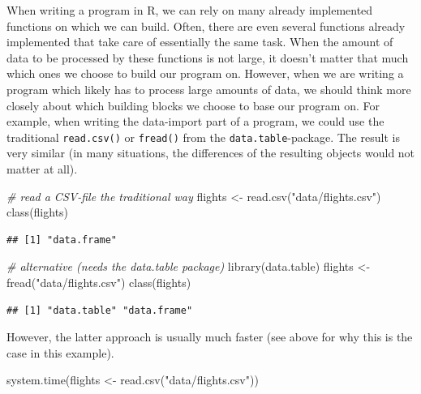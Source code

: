 \documentclass[
  12pt,
]{style/krantz}
\newenvironment{Shaded}{\begin{snugshade}}{\end{snugshade}}
\newcommand{\CommentTok}[1]{\textcolor[rgb]{0.56,0.35,0.01}{\textit{#1}}}
\newcommand{\FunctionTok}[1]{\textcolor[rgb]{0.00,0.00,0.00}{#1}}
\newcommand{\NormalTok}[1]{#1}
\newcommand{\OtherTok}[1]{\textcolor[rgb]{0.56,0.35,0.01}{#1}}
\newcommand{\StringTok}[1]{\textcolor[rgb]{0.31,0.60,0.02}{#1}}
\begin{document}
When writing a program in R, we can rely on many already implemented functions on which we can build. Often, there are even several functions already implemented that take care of essentially the same task. When the amount of data to be processed by these functions is not large, it doesn't matter that much which ones we choose to build our program on. However, when we are writing a program which likely has to process large amounts of data, we should think more closely about which building blocks we choose to base our program on. For example, when writing the data-import part of a program, we could use the traditional \texttt{read.csv()} or \texttt{fread()} from the \texttt{data.table}-package. The result is very similar (in many situations, the differences of the resulting objects would not matter at all).

\begin{Shaded}
\begin{Highlighting}[]
\CommentTok{\# read a CSV{-}file the \textquotesingle{}traditional way\textquotesingle{}}
\NormalTok{flights }\OtherTok{\textless{}{-}} \FunctionTok{read.csv}\NormalTok{(}\StringTok{"data/flights.csv"}\NormalTok{)}
\FunctionTok{class}\NormalTok{(flights)}
\end{Highlighting}
\end{Shaded}

\begin{verbatim}
## [1] "data.frame"
\end{verbatim}

\begin{Shaded}
\begin{Highlighting}[]
\CommentTok{\# alternative (needs the data.table package)}
\FunctionTok{library}\NormalTok{(data.table)}
\NormalTok{flights }\OtherTok{\textless{}{-}} \FunctionTok{fread}\NormalTok{(}\StringTok{"data/flights.csv"}\NormalTok{)}
\FunctionTok{class}\NormalTok{(flights)}
\end{Highlighting}
\end{Shaded}

\begin{verbatim}
## [1] "data.table" "data.frame"
\end{verbatim}

However, the latter approach is usually much faster (see above for why this is the case in this example).

\begin{Shaded}
\begin{Highlighting}[]
\FunctionTok{system.time}\NormalTok{(flights }\OtherTok{\textless{}{-}} \FunctionTok{read.csv}\NormalTok{(}\StringTok{"data/flights.csv"}\NormalTok{))}
\end{Highlighting}
\end{Shaded}
\end{document}

